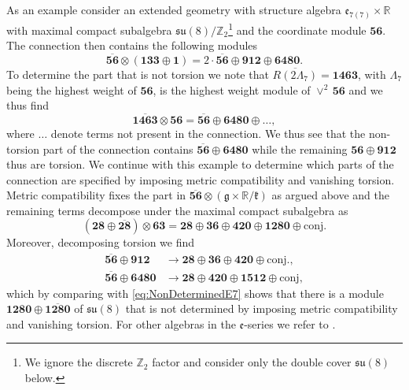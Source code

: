 As an example consider an extended geometry with structure algebra $\mathfrak{e}_{7(7)}\times\mathbb{R}$ with maximal compact subalgebra $\mathfrak{su}(8)/\mathbb{Z}_2$\footnote{We ignore the discrete $\mathbb{Z}_2$ factor and consider only the double cover $\mathfrak{su}(8)$ below.} and the coordinate module $\mathbf{56}$. The connection then contains the following modules 
\begin{equation}
    \overbar{\mathbf{56}}\otimes\left(\mathbf{133}\oplus\mathbf{1}\right) = 2\cdot \overbar{\mathbf{56}}\oplus\mathbf{912}\oplus\mathbf{6480}.
\end{equation}
To determine the part that is not torsion we note that $\overbar{R(2\Lambda_7)}=\mathbf{1463}$, with $\Lambda_7$ being the highest weight of $\mathbf{56}$, is the highest weight module of $\vee^2\,\mathbf{56}$ and we thus find 
\begin{equation}
    \overbar{\mathbf{1463}}\otimes\mathbf{56} = \overbar{\mathbf{56}}\oplus\mathbf{6480}\oplus\ldots,
\end{equation}
where $\ldots$ denote terms not present in the connection. We thus see that the non-torsion part of the connection contains $\overbar{\mathbf{56}}\oplus \mathbf{6480}$ while the remaining $\mathbf{56}\oplus\mathbf{912}$ thus are torsion. We continue with this example to determine which parts of the connection are specified by imposing metric compatibility and vanishing torsion. Metric compatibility fixes the part in $\overbar{\mathbf{56}}\otimes(\mathfrak{g}\times\mathbb{R}/\mathfrak{k})$ as argued above and the remaining terms decompose under the maximal compact subalgebra as 
\begin{equation}\label{eq:NonDeterminedE7}
    \left(\mathbf{28}\oplus\overbar{\mathbf{28}}\right)\otimes\mathbf{63} = \mathbf{28}\oplus\mathbf{36}\oplus\mathbf{420}\oplus\mathbf{1280}\oplus \text{conj.}
\end{equation}
Moreover, decomposing torsion we find  
\begin{equation}
    \begin{aligned}
        \overbar{\mathbf{56}}\oplus\mathbf{912}&\to \mathbf{28}\oplus\mathbf{36}\oplus\mathbf{420}\oplus\text{conj.},\\
        \overbar{\mathbf{56}}\oplus\mathbf{6480}&\to\mathbf{28}\oplus\mathbf{420}\oplus\mathbf{1512}\oplus\text{conj},
    \end{aligned}
\end{equation}
which by comparing with \eqref{eq:NonDeterminedE7} shows that there is a module $\mathbf{1280}\oplus\overbar{\mathbf{1280}}$ of $\mathfrak{su}(8)$ that is not determined by imposing metric compatibility and vanishing torsion. For other algebras in the $\mathfrak{e}$-series we refer to \cite{Cederwall:2013naa}. 

